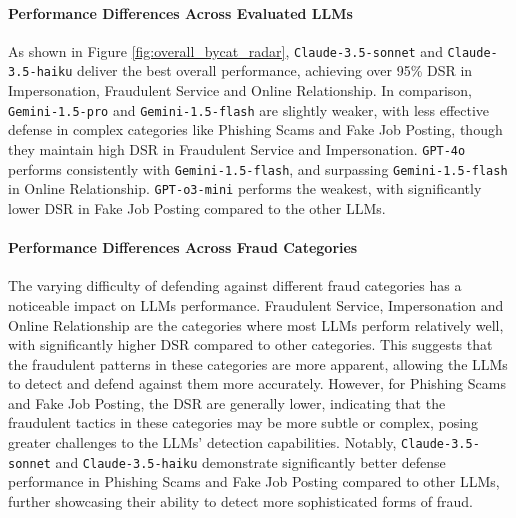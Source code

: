 \paragraph{Performance Differences Across Evaluated LLMs} As shown in Figure \ref{fig:overall_bycat_radar}, \texttt{Claude-3.5-sonnet} and \texttt{Claude-3.5-haiku} deliver the best overall performance, achieving over 95\% DSR in Impersonation, Fraudulent Service and Online Relationship. In comparison, \texttt{Gemini-1.5-pro} and \texttt{Gemini-1.5-flash} are slightly weaker, with less effective defense in complex categories like Phishing Scams and Fake Job Posting, though they maintain high DSR in Fraudulent Service and Impersonation. \texttt{GPT-4o} performs consistently with \texttt{Gemini-1.5-flash}, and surpassing \texttt{Gemini-1.5-flash} in Online Relationship. \texttt{GPT-o3-mini} performs the weakest, with significantly lower DSR in Fake Job Posting compared to the other LLMs.

\paragraph{Performance Differences Across Fraud Categories}

The varying difficulty of defending against different fraud categories has a noticeable impact on LLMs performance. Fraudulent Service, Impersonation and Online Relationship are the categories where most LLMs perform relatively well, with significantly higher DSR compared to other categories. This suggests that the fraudulent patterns in these categories are more apparent, allowing the LLMs to detect and defend against them more accurately. However, for Phishing Scams and Fake Job Posting, the DSR are generally lower, indicating that the fraudulent tactics in these categories may be more subtle or complex, posing greater challenges to the LLMs' detection capabilities. Notably, \texttt{Claude-3.5-sonnet} and \texttt{Claude-3.5-haiku} demonstrate significantly better defense performance in Phishing Scams and Fake Job Posting compared to other LLMs, further showcasing their ability to detect more sophisticated forms of fraud.